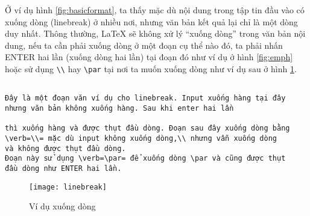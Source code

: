 Ở ví dụ hình \ref{fig:basicformat}, ta thấy mặc dù nội dung trong tập tin đầu vào có xuống dòng (linebreak) 
ở nhiều nơi, nhưng văn bản kết quả lại chỉ là một dòng duy nhất. Thông thường, LaTeX sẽ không xử lý “xuống dòng”
trong văn bản nội dung, nếu ta cần phải xuống dòng ở một đoạn cụ thể nào đó, ta phải nhấn ENTER hai lần 
(xuống dòng hai lần) tại đoạn đó như ví dụ ở hình \ref{fig:emph} hoặc sử dụng \verb=\\= hay \verb=\par=
tại nơi ta muốn xuống dòng như ví dụ sau ở hình \ref{fig:linebreak}.\par
\clearpage 
\begin{verbatim} 

Đây là một đoạn văn ví dụ cho linebreak. Input xuống hàng tại đây
nhưng văn bản không xuống hàng. Sau khi enter hai lần

thì xuống hàng và được thụt đầu dòng. Đoạn sau đây xuống dòng bằng
\verb=\\= mặc dù input không xuống dòng,\\ nhưng vẫn xuống dòng
và không được thụt đầu dòng. 
Đoạn này sử dụng \verb=\par= để xuống dòng \par và cũng được thụt 
đầu dòng như ENTER hai lần.

\end{verbatim}
\begin{figure}[H]
 \centering
 \texttt{[image: linebreak]}
 \caption{Ví dụ xuống dòng}
 \label{fig:linebreak} 
\end{figure}

